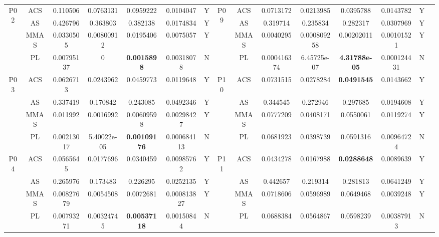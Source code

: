 \documentclass[twoside]{CUGThesis}
\begin{document}
\begin{table}[t]
{\begin{tabular}{ccccccc|cccccccl}
			\hline
			\multirow{4}{*}{P02}
			&   ACS     & 0.110506  &    0.0763131  &         0.0959222     & 0.0104047 &   Y   &
			\multirow{4}{*}{P09}
			&   ACS     & 0.0713172 &    0.0213985  &         0.0395788     & 0.0143782 &   Y   \\
			&   AS      & 0.426796  &    0.363803   &         0.382138      & 0.0174834 &   Y   &
			&   AS      & 0.319714  &    0.235834   &         0.282317      & 0.0307969 &   Y   \\
			&   MMAS    & 0.0330505 &    0.00800912 &         0.0195406     & 0.0075057 &   Y   &
			&   MMAS    & 0.0040295 &	 0.000809258&         0.00202011    & 0.00101521&   Y   \\
			&   PL      & 0.00795137&    0          & \textbf{0.0015898}    & 0.00318078&   N   &
			&   PL      &0.000416374&    6.45725e-07& \textbf{4.31788e-05}  &0.000124431&   N   \\
			
			\hline
			\multirow{4}{*}{P03}
			&   ACS     & 0.0626713 &    0.0243962  &         0.0459773     & 0.0119648 &   Y   &
			\multirow{4}{*}{P10}
			&   ACS     & 0.0731515 &    0.0278284  & \textbf{0.0491545}    & 0.0143662 &   Y   \\
			&   AS      & 0.337419  &    0.170842   &         0.243085      & 0.0492346 &   Y   &
			&   AS      & 0.344545  &    0.272946   &         0.297685      & 0.0194608 &   Y   \\
			&   MMAS    & 0.011992  &    0.0016992  &         0.00609598    & 0.00298427&   Y   &
			&   MMAS    & 0.0777209 &	 0.0408171  &         0.0550061     & 0.0119274 &   Y   \\
			&   PL      & 0.00213017&    5.40022e-05& \textbf{0.00109176}   &0.000684113&   N   &
			&   PL      & 0.0681923 &    0.0398739  &         0.0591316     & 0.00964724&   N   \\
			
			\hline
			\multirow{4}{*}{P04}
			&   ACS     & 0.0565645 &    0.0177696  &         0.0340459     & 0.00985762&   Y   &
			\multirow{4}{*}{P11}
			&   ACS     & 0.0434278 &    0.0167988  & \textbf{0.0288648}    & 0.0089639 &   Y   \\
			&   AS      & 0.265976  &    0.173483   &         0.226295      & 0.0252135 &   Y   &
			&   AS      & 0.442657  &    0.219314   &         0.281813      & 0.0641249 &   Y   \\
			&   MMAS    & 0.00827679&    0.0054508  &         0.0072681     &0.000813827&   Y   &
			&   MMAS    & 0.0718606 &    0.0596989  &         0.0649468     & 0.0039248 &   Y   \\
			&   PL      & 0.00793271&    0.00324745 & \textbf{0.00537118}   & 0.00150844&   N   &
			&   PL      & 0.0688384 &    0.0564867  &         0.0598239     & 0.00387913&   N   \\
			

\end{tabular}}
\end{table}
\end{document}
